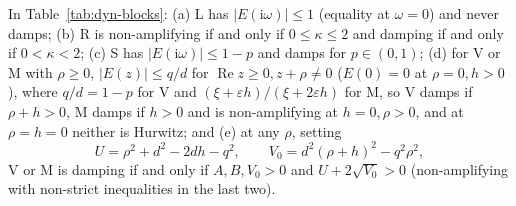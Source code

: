 \begin{proposition}\label{prop:dyn-k3}
In Table~\ref{tab:dyn-blocks}: (a) L has $|E(\mathrm{i}\omega)| \le 1$ (equality at $\omega = 0$) and never damps; (b) R is non-amplifying if and only if $0 \le \kappa \le 2$ and damping if and only if $0 < \kappa < 2$; (c) S has $|E(\mathrm{i}\omega)| \le 1 - p$ and damps for $p \in (0, 1)$; (d) for V or M with $\rho \ge 0$, $|E(z)| \le q/d$ for $\operatorname{Re} z \ge 0, z + \rho \ne 0$ ($E(0) = 0$ at $\rho = 0, h > 0$), where $q/d = 1 - p$ for V and $(\xi + \varepsilon h)/(\xi + 2\varepsilon h)$ for M, so V damps if $\rho + h > 0$, M damps if $h > 0$ and is non-amplifying at $h = 0, \rho > 0$, and at $\rho = h = 0$ neither is Hurwitz; and (e) at any $\rho$, setting
\begin{equation}\label{eq:dyn-uv}
U = \rho^2 + d^2 - 2dh - q^2, \qquad V_0 = d^2(\rho + h)^2 - q^2\rho^2,
\end{equation}
V or M is damping if and only if $A, B, V_0 > 0$ and $U + 2\sqrt{V_0} > 0$ (non-amplifying with non-strict inequalities in the last two).
\end{proposition}

